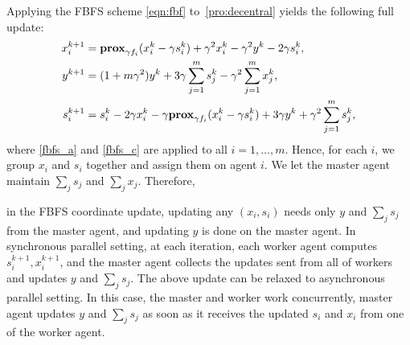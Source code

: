 Applying the FBFS scheme \eqref{eqn:fbf} to~\eqref{pro:decentral} yields the following full update:
\begin{subequations}
\begin{align}
x_i^{k+1} &= \prox_{\gamma f_i}(x_i^k-\gamma s_i^k)+\gamma^2 x_i^{k}-\gamma^2 y^k-2\gamma s_i^k, \label{fbfs_a} \\
y^{k+1} &= (1+m\gamma^2)y^k +3\gamma \sum_{j=1}^m s_j^k -\gamma^2 \sum_{j=1}^m x_j^k,\\
s_i^{k+1} &= s_i^k-2\gamma x_i^k-\gamma \prox_{\gamma f_i}(x_i^k-\gamma s_i^k)+3\gamma y^k+ \gamma^2 \sum_{j=1}^m s_j^k, \label{fbfs_c}
\end{align}
\end{subequations}
{where }\eqref{fbfs_a} {and }\eqref{fbfs_c} {are applied to all $i=1,\ldots,m$.
Hence, for each $i$, } we group  $x_i$ and $s_i$ together and assign them on agent $i$.  {We let the master agent } maintain $\sum_j s_j$ and $\sum_j x_j$. Therefore, {in the FBFS coordinate update, updating any $(x_i,s_i)$ needs only $y$ and $\sum_j s_j$ from the master agent, and updating $y$ is done on the master agent. In synchronous parallel setting, at each iteration, each worker agent computes $s_i^{k+1}, x_i^{k+1}$, and the master agent collects the updates sent from all of workers and updates $y$ and $\sum_j s_j$. The above update can be relaxed to asynchronous parallel setting. In this case, the master and worker work concurrently, master agent updates $y$ and $\sum_j s_j$ as soon as it receives the updated $s_i$ and $x_i$ from one of the worker agent. 


}
